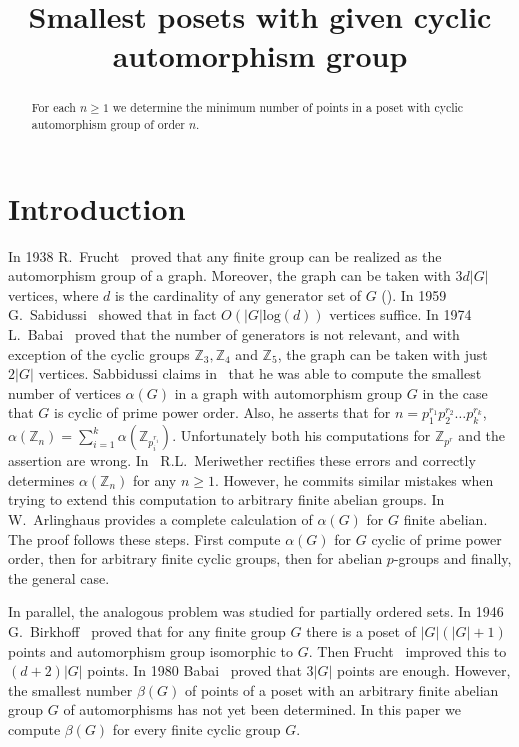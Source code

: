 \documentclass[ALCO,published]{cedram}
\title{Smallest posets with given cyclic automorphism group}
\author[\initial{J.} \middlename{A.} Barmak]{\firstname{Jonathan} \middlename{Ariel} \lastname{Barmak}}
\author[\initial{A.} \middlename{N.} Barreto]{\firstname{Agust\'in} \middlename{Nicol\'as} \lastname{Barreto}}
\newcommand{\Z}{\mathbb{Z}}
\begin{document}
\begin{abstract}
For each $n\ge 1$ we determine the minimum number of points in a poset with cyclic automorphism group of order $n$.
\end{abstract}

\maketitle

\section{Introduction}

In 1938 R.~Frucht~\cite{Fru} proved that any finite group can be realized as the automorphism group of a graph. Moreover, the graph can be taken with $3d|G|$ vertices, where $d$ is the cardinality of any generator set of $G$ (\cite[Theorems 3.2, 4.2]{Fru49}). In 1959 G.~Sabidussi~\cite{Sab} showed that in fact $O(|G|\textrm{log}(d))$ vertices suffice. In 1974 L.~Babai~\cite{Bab} proved that the number of generators is not relevant, and with exception of the cyclic groups $\Z_3, \Z_4$ and $\Z_5$, the graph can be taken with just $2|G|$ vertices. Sabbidussi claims in~\cite{Sab} that he was able to compute the smallest number of vertices $\alpha (G)$ in a graph with automorphism group $G$ in the case that $G$ is cyclic of prime power order. Also, he asserts that for $n=p_1^{r_1}p_2^{r_2}\ldots p_k^{r_k}$, $\alpha (\Z_n)=\sum\limits_{i=1}^k \alpha(\Z_{p_i^{r_i}})$. Unfortunately both his computations for $\Z_{p^r}$ and the assertion are wrong. In~\cite{Mer} R.L.~Meriwether rectifies these errors and correctly determines $\alpha(\Z_n)$ for any $n\ge 1$. However, he commits similar mistakes when trying to extend this computation to arbitrary finite abelian groups. In~\cite{Arl1, Arl2} W.~Arlinghaus provides a complete calculation of $\alpha (G)$ for $G$ finite abelian. The proof follows these steps. First compute $\alpha (G)$ for $G$ cyclic of prime power order, then for arbitrary finite cyclic groups, then for abelian $p$-groups and finally, the general case.

In parallel, the analogous problem was studied for partially ordered sets. In 1946 G.~Birkhoff~\cite{Bir} proved that for any finite group $G$ there is a poset of $|G|(|G|+1)$ points and automorphism group isomorphic to $G$. Then Frucht~\cite{Fru50} improved this to $(d+2)|G|$ points. In 1980 Babai~\cite{Bab2} proved that $3|G|$ points are enough. However, the smallest number $\beta (G)$ of points of a poset with an arbitrary finite abelian group $G$ of automorphisms has not yet been determined. In this paper we compute $\beta (G)$ for every finite cyclic group $G$. 
\end{document}

